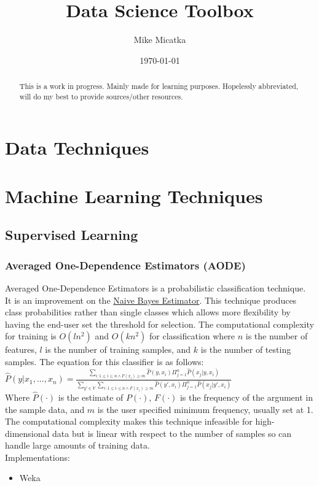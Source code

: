 \documentclass{report}
\title{Data Science Toolbox}
\author{
	Mike Micatka
}
\date{\today}
\begin{document}
\maketitle

\tableofcontents

\renewcommand{\abstractname}{What is Data Science?}
\begin{abstract}
This is a work in progress. Mainly made for learning purposes. Hopelessly 
abbreviated, will do my best to provide sources/other resources.
\end{abstract}

\chapter{Data Techniques}

\chapter{Machine Learning Techniques}
\section{Supervised Learning}
	\subsection{Averaged One-Dependence Estimators (AODE)}
Averaged One-Dependence Estimators is a probabilistic classification technique.
It is an improvement on the \hyperref[subsec:bayesian_statistics]{Naive Bayes
 Estimator}. This technique produces class probabilities rather than single
  classes which allows more flexibility by having the end-user set the threshold
   for selection. The computational complexity for training is $O(ln^2)$ and
    $O(kn^2)$ for classification where $n$ is the number of features, $l$ is
     the number of training samples, and $k$ is the number of testing samples.
      The equation for this classifier is as follows:\\
$
\hat{P}(y|x_1, ..., x_n) = \frac{
\sum_{i:1 \leq i \leq n \wedge F(x_i) \geq m} \hat{P}(y,x_i) \Pi ^n _{j=1} \hat{P}(x_j | y, x_i)
}
{
\sum_{y'\in Y} \sum _{i:1 \leq i \leq n \wedge F(x_i) \geq m} \hat{P}(y',x_i) \Pi ^n _{j=1} \hat{P} (x_j | y', x_i)
}
$\\
Where $\hat{P}(\cdot)$ is the estimate of $P(\cdot)$, $F(\cdot)$ is the frequency of the argument in the sample data, and $m$ is the user specified minimum frequency, usually set at 1.\\
The computational complexity makes this technique infeasible for high-dimensional data but is linear with respect to the number of samples so can handle large amounts of training data. 
\\
Implementations:
\begin{itemize}
\item Weka
\end{itemize}
\end{document}
